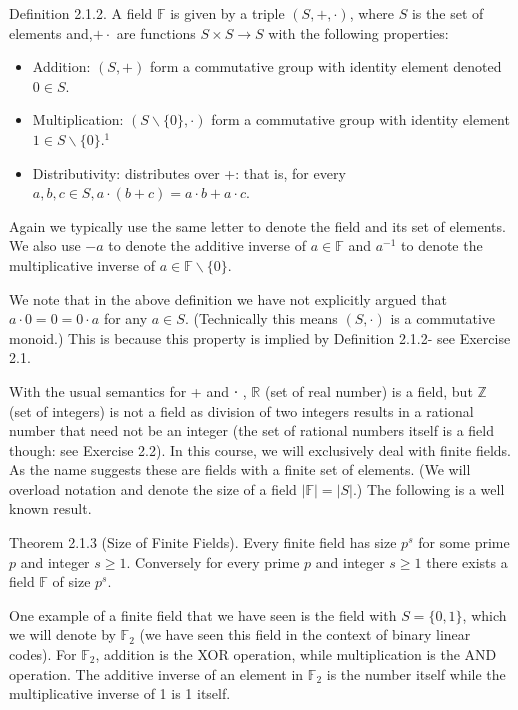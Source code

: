 \documentclass[10pt]{article}
\begin{document}
Definition 2.1.2. A field $\mathbb{F}$ is given by a triple $(S,+, \cdot)$, where $S$ is the set of elements and,$+ \cdot$ are functions $S \times S \rightarrow S$ with the following properties:

\begin{itemize}
  \item[-] Addition: $(S,+)$ form a commutative group with identity element denoted $0 \in S$.
  \item[-] Multiplication: $(S \backslash\{0\}, \cdot)$ form a commutative group with identity element $1 \in S \backslash\{0\} .^{1}$
  \item[-] Distributivity: distributes over +: that is, for every $a, b, c \in S, a \cdot(b+c)=a \cdot b+a \cdot c$.
\end{itemize}

Again we typically use the same letter to denote the field and its set of elements. We also use $-a$ to denote the additive inverse of $a \in \mathbb{F}$ and $a^{-1}$ to denote the multiplicative inverse of $a \in \mathbb{F} \backslash\{0\}$.

We note that in the above definition we have not explicitly argued that $a \cdot 0=0=0 \cdot a$ for any $a \in S$. (Technically this means $(S, \cdot)$ is a commutative monoid.) This is because this property is implied by Definition 2.1.2- see Exercise 2.1.

With the usual semantics for + and ⋅ , $\mathbb{R}$ (set of real number) is a field, but $\mathbb{Z}$ (set of integers) is not a field as division of two integers results in a rational number that need not be an integer (the set of rational numbers itself is a field though: see Exercise 2.2). In this course, we will exclusively deal with finite fields. As the name suggests these are fields with a finite set of elements. (We will overload notation and denote the size of a field $|\mathbb{F}|=|S|$.) The following is a well known result.

Theorem 2.1.3 (Size of Finite Fields). Every finite field has size $p^{s}$ for some prime $p$ and integer $s \geq 1$. Conversely for every prime $p$ and integer $s \geq 1$ there exists a field $\mathbb{F}$ of size $p^{s}$.

One example of a finite field that we have seen is the field with $S=\{0,1\}$, which we will denote by $\mathbb{F}_{2}$ (we have seen this field in the context of binary linear codes). For $\mathbb{F}_{2}$, addition is the XOR operation, while multiplication is the AND operation. The additive inverse of an element in $\mathbb{F}_{2}$ is the number itself while the multiplicative inverse of 1 is 1 itself.
\end{document}
